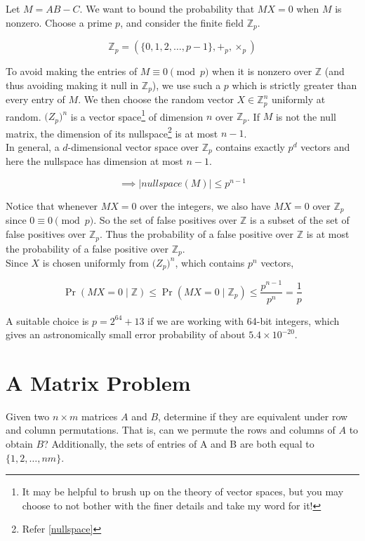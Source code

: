 Let \(M=AB-C\). We want to bound the probability that \(MX=0\) when 
\(M\) is nonzero. Choose a prime \(p\), and consider the finite field $\mathbb Z_p$.

\[
\mathbb Z_p=(\{0,1,2,\dots,p-1\},+_p,\times_p)
\]

\noindent To avoid making the entries of $M\equiv0\pmod{p}$ when it is 
nonzero over \(\mathbb Z\) (and thus avoiding making it null in $\mathbb Z_p$), we use such a $p$
which is strictly greater than every entry of $M$. We then choose the random 
vector $X\in\mathbb Z_p^n$ uniformly at random. \(\mathbb (Z_p)^n\) is a vector space\footnote{It may be helpful to brush up on 
the theory of vector spaces, but you may choose to not bother with the finer details 
and take my word for it!} of dimension \(n\) over \(\mathbb Z_p\). If $M$ is not the null matrix, 
the dimension of its nullspace\footnote{Refer \autoref{nullspace}} is at most \(n-1\).\\

\noindent In general, a \(d\)-dimensional vector space over \(\mathbb Z_p\) contains exactly 
\(p^d\) vectors and here the nullspace has dimension at most \(n-1\).

\[
\implies |nullspace(M)| \le p^{n-1}
\]

\noindent Notice that whenever \(MX=0\) over the integers, we also have \(MX=0\) over \(\mathbb Z_p\) 
since $0 \equiv 0\pmod{p}$. So the set of false positives over \(\mathbb Z\) is a subset 
of the set of false positives over \(\mathbb Z_p\). Thus the 
probability of a false positive over \(\mathbb Z\) is 
at most the probability of a false positive over \(\mathbb Z_p\).\\


\noindent Since \(X\) is chosen uniformly from \(\mathbb (Z_p)^n\), which contains \(p^n\) vectors,

\[
\Pr(MX=0 \mid \mathbb Z) \le \Pr(MX=0 \mid \mathbb Z_p)
\le
\frac{p^{n-1}}{p^n}
=
\frac1p
\]

A suitable choice is \hspace{0.1em} $p=2^{64}+13$ \hspace{0.2em}if we are working with 64-bit integers, 
which gives an astronomically small error probability of about $5.4\times10^{-20}$.

\section{A Matrix Problem}

Given two \(n\times m\) matrices \(A\) and \(B\), determine if they are equivalent under row 
and column permutations. That is, can we permute the rows and columns of \(A\) to obtain \(B\)?
Additionally, the sets of entries of A and B are both equal to $\{1,2,\dots,nm\}$. \\

